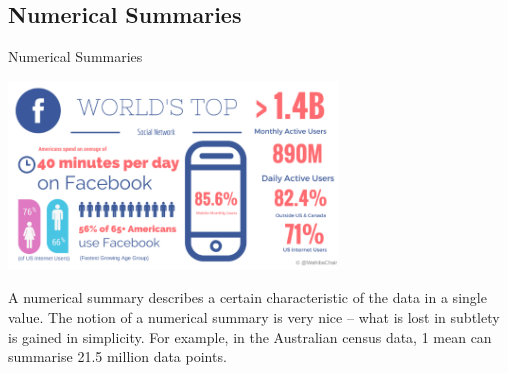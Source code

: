 \documentclass[t,xcolor=pdftex,dvipsnames,table]{beamer}
\begin{document}
\subsection[]{Numerical Summaries}
\begin{frame}[fragile]{Numerical Summaries}
\begin{center}
\includegraphics[height=5cm]{../images/SocialMedia2015.png}
\end{center}

A numerical summary describes a certain characteristic of the data in a single value. The notion of a numerical summary is very nice – what is lost in subtlety is gained in simplicity.
For example, in the Australian census data, 1 mean can summarise 21.5 million data points. 
\href{https://www.linkedin.com/pulse/2015-social-media-stats-trends-images-part-1-wahiba-chair-mba}{}
\href{http:\\www.censusdata.abs.gov.au/census_services/getproduct/census/2011/quickstat/0}{}
\end{frame}
\end{document}
